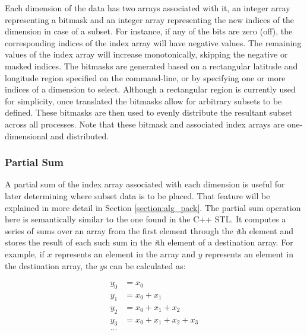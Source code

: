 Each dimension of the data has two arrays associated with it, an integer array
representing a bitmask and an integer array representing the new indices of
the dimension in case of a subset.  For instance, if any of the bits are zero
(off), the corresponding indices of the index array will have negative values.
The remaining values of the index array will increase monotonically, skipping
the negative or masked indices.  The bitmasks are generated based on a
rectangular latitude and longitude region specified on the command-line, or by
specifying one or more indices of a dimension to select.  Although a
rectangular region is currently used for simplicity, once translated the
bitmasks allow for arbitrary subsets to be defined.  These bitmasks are then
used to evenly distribute the resultant subset across all processes.  Note
that these bitmask and associated index arrays are one-dimensional and
distributed.

\subsubsection{Partial Sum}


A partial sum of the index array associated with each dimension is useful for
later determining where subset data is to be placed.  That feature will be
explained in more detail in Section \ref{section:alg_pack}.  The partial sum
operation here is semantically similar to the one found in the C++
STL\cite{CXXSTL}.  It computes a series of sums over an array from the first
element through the \emph{i}th element and stores the result of each such sum
in the \emph{i}th element of a destination array.  For example, if $x$
represents an element in the array and $y$ represents an element in the
destination array, the $y$s can be calculated as:

\begin{equation}
\begin{split}
y_0 &= x_0\\
y_1 &= x_0 + x_1\\
y_2 &= x_0 + x_1 + x_2\\
y_3 &= x_0 + x_1 + x_2 + x_3\\
\ldots
\end{split}
\end{equation}

